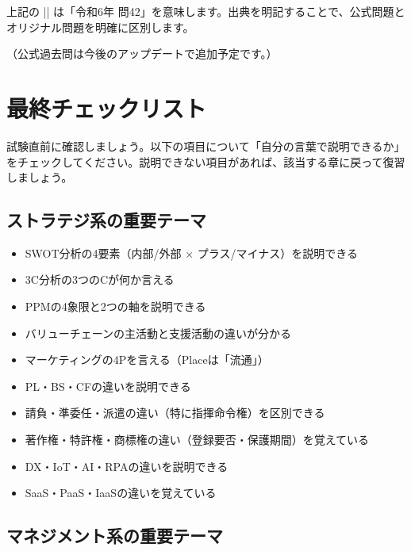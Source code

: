 \vspace{0.5em}
\noindent 上記の || は「令和6年 問42」を意味します。出典を明記することで、公式問題とオリジナル問題を明確に区別します。

\vspace{1em}
\noindent （公式過去問は今後のアップデートで追加予定です。）

\section{最終チェックリスト}

試験直前に確認しましょう。以下の項目について「自分の言葉で説明できるか」をチェックしてください。説明できない項目があれば、該当する章に戻って復習しましょう。

\vspace{0.5em}

\subsection*{ストラテジ系の重要テーマ}

\begin{itemize}
  \item[$\square$] SWOT分析の4要素（内部/外部 × プラス/マイナス）を説明できる
  \item[$\square$] 3C分析の3つのCが何か言える
  \item[$\square$] PPMの4象限と2つの軸を説明できる
  \item[$\square$] バリューチェーンの主活動と支援活動の違いが分かる
  \item[$\square$] マーケティングの4Pを言える（Placeは「流通」）
  \item[$\square$] PL・BS・CFの違いを説明できる
  \item[$\square$] 請負・準委任・派遣の違い（特に指揮命令権）を区別できる
  \item[$\square$] 著作権・特許権・商標権の違い（登録要否・保護期間）を覚えている
  \item[$\square$] DX・IoT・AI・RPAの違いを説明できる
  \item[$\square$] SaaS・PaaS・IaaSの違いを覚えている
\end{itemize}

\subsection*{マネジメント系の重要テーマ}

